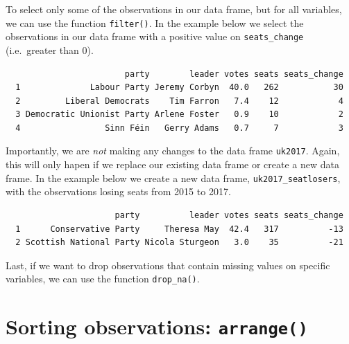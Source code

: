 \documentclass[12pt,oneside]{reedthesis}
\theoremstyle{definition}
\theoremstyle{definition}
\theoremstyle{definition}
\theoremstyle{remark}
\begin{document}
  To select only some of the observations in our data frame, but for all
  variables, we can use the function \texttt{filter()}. In the example
  below we select the observations in our data frame with a positive value
  on \texttt{seats\_change} (i.e.~greater than 0).
  \begin{Shaded}
  \begin{Highlighting}[]
  \OperatorTok{>}\StringTok{ }\NormalTok{)}
  \end{Highlighting}
  \end{Shaded}
  \begin{verbatim}
                        party        leader votes seats seats_change
  1              Labour Party Jeremy Corbyn  40.0   262           30
  2         Liberal Democrats    Tim Farron   7.4    12            4
  3 Democratic Unionist Party Arlene Foster   0.9    10            2
  4                 Sinn Féin   Gerry Adams   0.7     7            3
  \end{verbatim}
  Importantly, we are \emph{not} making any changes to the data frame
  \texttt{uk2017}. Again, this will only hapen if we replace our existing
  data frame or create a new data frame. In the example below we create a
  new data frame, \texttt{uk2017\_seatlosers}, with the observations
  losing seats from 2015 to 2017.
  \begin{Shaded}
  \begin{Highlighting}[]
  \StringTok{ }\OperatorTok{<}\StringTok{ }\NormalTok{)}
  \end{Highlighting}
  \end{Shaded}
  \begin{verbatim}
                      party          leader votes seats seats_change
  1      Conservative Party     Theresa May  42.4   317          -13
  2 Scottish National Party Nicola Sturgeon   3.0    35          -21
  \end{verbatim}
  Last, if we want to drop observations that contain missing values on
  specific variables, we can use the function \texttt{drop\_na()}.
  
  \section{\texorpdfstring{Sorting observations:
  \texttt{arrange()}}{Sorting observations: arrange()}}\label{sorting-observations-arrange}
  
\end{document}
